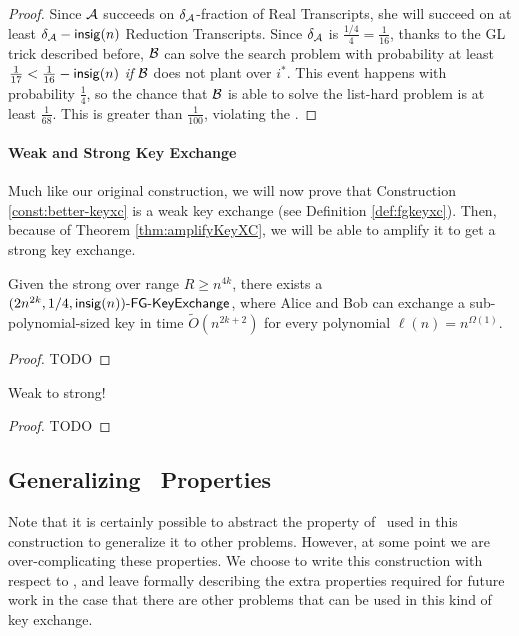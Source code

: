 \begin{proof}
	Since $\mathcal{A}$ succeeds on $\delta_{\mathcal{A}}$-fraction of Real Transcripts, she will succeed on at least $\delta_{\mathcal{A}} - \mathsf{insig}(n)$ Reduction Transcripts. Since $\delta_{\mathcal{A}}$ is $\frac{1/4}{4} = \frac{1}{16}$, thanks to the GL trick described before, ${\cal B}$ can solve the search problem with probability at least $\frac{1}{17} < \frac{1}{16} - \mathsf{insig}(n)$ \emph{if} ${\cal B}$ does not plant over $i^*$. This event happens with probability $\frac{1}{4}$, so the chance that ${\cal B}$ is able to solve the list-hard problem is at least $\frac{1}{68}$.
	This is greater than $\frac{1}{100}$, violating the \strongzkc.
\end{proof}

\paragraph{Weak and Strong Key Exchange}
Much like our original construction, we will now prove that Construction \ref{const:better-keyxc} is a weak key exchange (see Definition \ref{def:fgkeyxc}). Then, because of Theorem \ref{thm:amplifyKeyXC}, we will be able to amplify it to get a strong key exchange.

\begin{theorem}
	Given the strong \zkclique over range $R \ge n^{4k}$, there exists a
	$(2n^{2k}, 1/4, \mathsf{insig}(n))\textsf{-FG-KeyExchange}$, where Alice and Bob can exchange a sub-polynomial-sized key in time $\tilde{O}\left(n^{2k + 2}\right)$ for every polynomial $\ell(n)= n ^{\Omega(1)}$.
\end{theorem}
\begin{proof}
	TODO
\end{proof}

\begin{corollary}
	Weak to strong! %
\end{corollary}
\begin{proof}
	TODO
\end{proof}

\subsection{Generalizing \zkclique~Properties}
Note that it is certainly possible to abstract the property of \zkclique~used in this construction to generalize it to other problems. However, at some point we are over-complicating these properties. We choose to write this construction with respect to \zkclique, and leave formally describing the extra properties required for future work in the case that there are other problems that can be used in this kind of key exchange.
